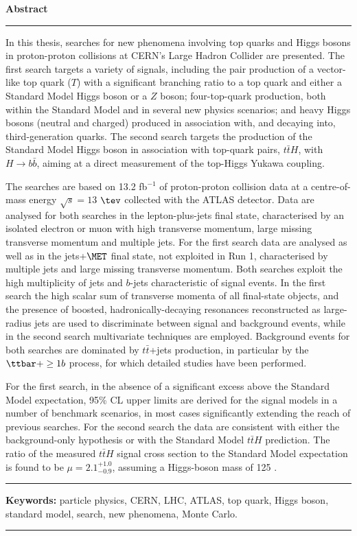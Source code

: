 \thispagestyle{plain}
\phantom{\tiny test}

\noindent \Huge{\textbf{Abstract}}
\begin{center}
\rule{\linewidth}{.4pt}
\end{center}

\normalsize
\vspace{0.7cm}


In this thesis, searches for new phenomena involving top quarks and Higgs bosons in proton-proton collisions at CERN's Large Hadron Collider are presented.
The first search targets a variety of signals, including the pair production of a vector-like top quark ($T$) with a significant branching ratio to a top quark and either a Standard Model Higgs boson or a $Z$ boson; four-top-quark production, both within the Standard Model and in several new physics scenarios; and heavy Higgs bosons (neutral and charged) produced in association with, and decaying into, third-generation quarks.
The second search targets the production of the Standard Model Higgs boson in association with top-quark pairs, $t\bar{t}H$, with $H\to b\bar{b}$, aiming at a direct measurement of the top-Higgs Yukawa coupling.\par
The searches are based on 13.2 fb$^{-1}$ of proton-proton collision data at a centre-of-mass energy $\sqrt{s}=13$ $\tev$ collected with the ATLAS detector. Data are analysed for both searches in the lepton-plus-jets final state, characterised by an isolated electron or muon with high transverse momentum, large missing transverse momentum and multiple jets. For the first search data are analysed as well as in the jets+$\MET$ final state, not exploited in Run 1, characterised by multiple jets and large missing transverse momentum. Both searches exploit the high multiplicity of jets and $b$-jets characteristic of signal events. In the first search the high scalar sum of transverse momenta of all final-state objects, and the presence of boosted, hadronically-decaying resonances reconstructed as large-radius jets are used to discriminate between signal and background events, while in the second search multivariate techniques are employed. Background events for both searches are dominated by $t\bar{t}$+jets production, in particular by the $\ttbar+\ge1b$ process, for which detailed studies have been performed.\par
For the first search, in the absence of a significant excess above the Standard Model expectation, 95\% CL upper limits are derived for the signal models in a number of benchmark scenarios, in most cases significantly extending the reach of previous searches. For the second search the data are consistent with either the background-only hypothesis or with the Standard Model $t\bar{t}H$ prediction. The ratio of the measured $t\bar{t}H$ signal cross section to the Standard Model expectation is found to be $\mu=2.1^{+1.0}_{-0.9}$, assuming a Higgs-boson mass of 125 \gev.

\vspace{0.5cm}

\begin{center}
\rule{\linewidth}{.4pt} 
\end{center}
\textbf{Keywords:} particle physics, CERN, LHC, ATLAS, top quark, Higgs boson, standard model, search, new phenomena, Monte Carlo.
\begin{center}
\rule{\linewidth}{.4pt}
\end{center}




